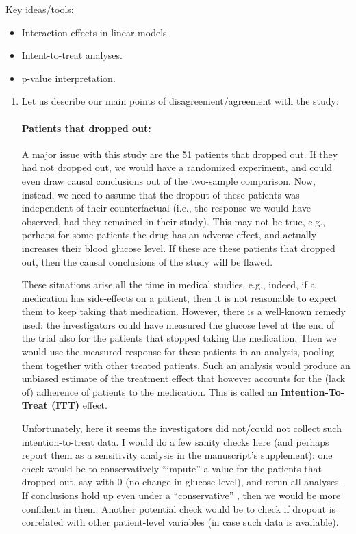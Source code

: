 Key ideas/tools:
\begin{itemize}
  \item Interaction effects in linear models.
  \item Intent-to-treat analyses.
  \item p-value interpretation.
\end{itemize}



\begin{enumerate}[label=(\alph*)]
\item Let us describe our main points of disagreement/agreement with the study:

\paragraph{Patients that dropped out:} A major issue with this study are the 51 patients that dropped out. If they had not dropped out, we would have a randomized experiment, and could even draw causal conclusions out of the two-sample comparison. Now, instead, we need to assume that the dropout of these patients was independent of their counterfactual (i.e., the response we would have observed, had they remained in their study). This may not be true, e.g., perhaps for some patients the drug has an adverse effect, and actually increases their blood glucose level. If these are these patients that dropped out, then the causal conclusions of the study will be flawed.

These situations arise all the time in medical studies, e.g., indeed, if a medication has side-effects on a patient, then it is not reasonable to expect them to keep taking that medication. However, there is a well-known remedy used: the investigators could have measured the glucose level at the end of the trial also for the patients that stopped taking the medication. Then we would use the measured response for these patients in an analysis, pooling them together with other treated patients. Such an analysis would produce an unbiased estimate of the treatment effect that however accounts for the (lack of) adherence of patients to the medication. This is called an \textbf{Intention-To-Treat  (ITT)} effect.

Unfortunately, here it seems the investigators did not/could not collect such intention-to-treat data. I would do a few sanity checks here (and perhaps report them as a sensitivity analysis in the manuscript's supplement): one check would be to conservatively ``impute'' a value for the patients that dropped out, say with $0$ (no change in glucose level), and rerun all analyses. If conclusions hold up even under a ``conservative'' , then we would be more confident in them. Another potential check would be to check if dropout is correlated with other patient-level variables (in case such data is available).


\end{enumerate}
